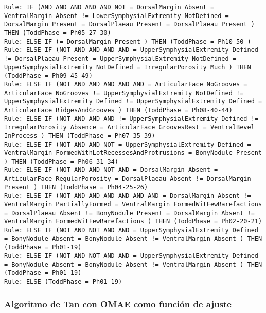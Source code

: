 \begin{lstlisting}
Rule: IF (AND AND AND AND AND NOT = DorsalMargin Absent = VentralMargin Absent != LowerSymphysialExtremity NotDefined = DorsalMargin Present = DorsalPlaeau Present = DorsalPlaeau Present ) THEN (ToddPhase = Ph05-27-30)
Rule: ELSE IF (= DorsalMargin Present ) THEN (ToddPhase = Ph10-50-)
Rule: ELSE IF (NOT AND AND AND AND = UpperSymphysialExtremity Defined != DorsalPlaeau Present = UpperSymphysialExtremity NotDefined = UpperSymphysialExtremity NotDefined = IrregularPorosity Much ) THEN (ToddPhase = Ph09-45-49)
Rule: ELSE IF (NOT AND AND AND AND AND = ArticularFace NoGrooves = ArticularFace NoGrooves != UpperSymphysialExtremity NotDefined != UpperSymphysialExtremity Defined != UpperSymphysialExtremity Defined = ArticularFace RidgesAndGrooves ) THEN (ToddPhase = Ph08-40-44)
Rule: ELSE IF (NOT AND AND AND != UpperSymphysialExtremity Defined != IrregularPorosity Absence = ArticularFace GroovesRest = VentralBevel InProcess ) THEN (ToddPhase = Ph07-35-39)
Rule: ELSE IF (NOT AND AND NOT = UpperSymphysialExtremity Defined = VentralMargin FormedWithLotRecessesAndProtrusions = BonyNodule Present ) THEN (ToddPhase = Ph06-31-34)
Rule: ELSE IF (NOT AND AND NOT AND = DorsalMargin Absent = ArticularFace RegularPorosity = DorsalPlaeau Absent != DorsalMargin Present ) THEN (ToddPhase = Ph04-25-26)
Rule: ELSE IF (NOT AND AND AND AND AND AND = DorsalMargin Absent != VentralMargin PartiallyFormed = VentralMargin FormedWitFewRarefactions = DorsalPlaeau Absent != BonyNodule Present = DorsalMargin Absent != VentralMargin FormedWitFewRarefactions ) THEN (ToddPhase = Ph02-20-21)
Rule: ELSE IF (NOT AND NOT AND AND = UpperSymphysialExtremity Defined = BonyNodule Absent = BonyNodule Absent != VentralMargin Absent ) THEN (ToddPhase = Ph01-19)
Rule: ELSE IF (NOT AND NOT AND AND = UpperSymphysialExtremity Defined = BonyNodule Absent = BonyNodule Absent != VentralMargin Absent ) THEN (ToddPhase = Ph01-19)
Rule: ELSE (ToddPhase = Ph01-19)
\end{lstlisting}


\subsubsection{Algoritmo de Tan con OMAE como función de ajuste}

